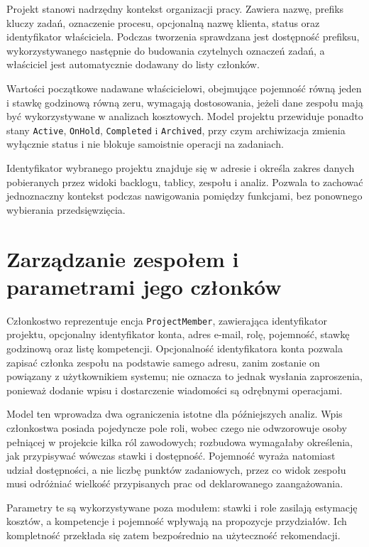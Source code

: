 Projekt stanowi nadrzędny kontekst organizacji pracy. Zawiera nazwę, prefiks kluczy zadań, oznaczenie procesu, opcjonalną nazwę klienta, status oraz identyfikator właściciela. Podczas tworzenia sprawdzana jest dostępność prefiksu, wykorzystywanego następnie do budowania czytelnych oznaczeń zadań, a właściciel jest automatycznie dodawany do listy członków.

Wartości początkowe nadawane właścicielowi, obejmujące pojemność równą jeden i stawkę godzinową równą zeru, wymagają dostosowania, jeżeli dane zespołu mają być wykorzystywane w analizach kosztowych. Model projektu przewiduje ponadto stany \texttt{Active}, \texttt{OnHold}, \texttt{Completed} i \texttt{Archived}, przy czym archiwizacja zmienia wyłącznie status i nie blokuje samoistnie operacji na zadaniach.

Identyfikator wybranego projektu znajduje się w adresie i określa zakres danych pobieranych przez widoki backlogu, tablicy, zespołu i analiz. Pozwala to zachować jednoznaczny kontekst podczas nawigowania pomiędzy funkcjami, bez ponownego wybierania przedsięwzięcia.

\section{Zarządzanie zespołem i parametrami jego członków}

Członkostwo reprezentuje encja \texttt{ProjectMember}, zawierająca identyfikator projektu, opcjonalny identyfikator konta, adres e-mail, rolę, pojemność, stawkę godzinową oraz listę kompetencji. Opcjonalność identyfikatora konta pozwala zapisać członka zespołu na podstawie samego adresu, zanim zostanie on powiązany z użytkownikiem systemu; nie oznacza to jednak wysłania zaproszenia, ponieważ dodanie wpisu i dostarczenie wiadomości są odrębnymi operacjami.

Model ten wprowadza dwa ograniczenia istotne dla późniejszych analiz. Wpis członkostwa posiada pojedyncze pole roli, wobec czego nie odwzorowuje osoby pełniącej w projekcie kilka ról zawodowych; rozbudowa wymagałaby określenia, jak przypisywać wówczas stawki i dostępność. Pojemność wyraża natomiast udział dostępności, a nie liczbę punktów zadaniowych, przez co widok zespołu musi odróżniać wielkość przypisanych prac od deklarowanego zaangażowania.

Parametry te są wykorzystywane poza modułem: stawki i role zasilają estymację kosztów, a kompetencje i pojemność wpływają na propozycje przydziałów. Ich kompletność przekłada się zatem bezpośrednio na użyteczność rekomendacji.


